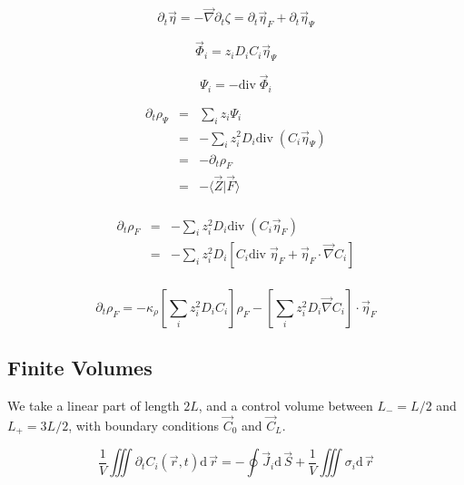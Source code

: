 \documentclass[aps,12pt]{revtex4}
\begin{document}
\begin{equation}
	\partial_t \vec \eta = - \vec\nabla \partial_t \zeta = \partial_t \vec\eta_F + \partial_t \vec\eta_\Psi
\end{equation}

\begin{equation}
	\vec \Phi_i = z_i D_i C_i \vec\eta_\Psi
\end{equation}

\begin{equation}
	\Psi_i = - \mathrm{div}\; \vec \Phi_i 
\end{equation}

\begin{equation}
\begin{array}{rcl}
	\partial_t \rho_\Psi & = & \sum_i z_i \Psi_i \\
	& = &  - \sum_i z_i^2 D_i \mathrm{div}\;(C_i \vec \eta_\Psi)\\
	& = &  - \partial_t \rho_F\\
	& = &  - \langle \vec Z \vert \vec F \rangle \\
\end{array}
\end{equation}

\begin{equation}
\begin{array}{rcl}
\partial_t \rho_F & = & - \sum_i z_i^2 D_i \mathrm{div}\;(C_i \vec \eta_F)\\
 & = & - \sum_i z_i^2 D_i \left[ C_i \mathrm{div}\;  \vec \eta_F + \vec \eta_F \cdot \vec \nabla C_i \right]\\
 \end{array}
\end{equation}

\begin{equation}
\partial_t \rho_F  = - \kappa_\rho \left[\sum_i z_i^2 D_i C_i\right] \rho_F - 
\left[\sum_i z_i^2 D_i \vec \nabla C_i \right] \cdot \vec \eta_F
\end{equation}


\subsection{Finite Volumes}

We take a linear part of length $2L$, and a control volume between $L_-=L/2$ and $L_+=3L/2$,
with boundary conditions $\vec C_0$ and $\vec C_L$.

\begin{equation}
	\dfrac{1}{V} \iiint \partial_t C_i(\vec r,t)  \mathrm{d}\, \vec r
	= - \oint  	\vec{J}_i \mathrm{d}\, \vec S + \dfrac{1}{V} \iiint \sigma_i \mathrm{d}\, \vec r
\end{equation}
 
\end{document}
